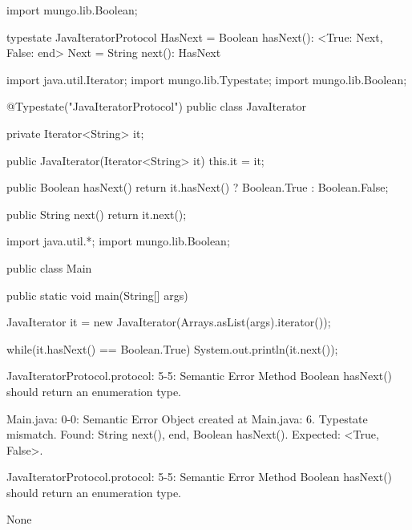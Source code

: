 \begin{code}
import mungo.lib.Boolean;

typestate JavaIteratorProtocol {
  HasNext = {
    Boolean hasNext(): <True: Next, False: end>
  }
  Next = {
    String next(): HasNext
  }
}\end{code}

\begin{code}
import java.util.Iterator;
import mungo.lib.Typestate;
import mungo.lib.Boolean;

@Typestate("JavaIteratorProtocol")
public class JavaIterator {

  private Iterator<String> it;

  public JavaIterator(Iterator<String> it) {
    this.it = it;
  }

	public Boolean hasNext() {
    return it.hasNext() ? Boolean.True : Boolean.False;
  }

  public String next() {
    return it.next();
  }

}\end{code}

\begin{code}
import java.util.*;
import mungo.lib.Boolean;

public class Main {
	public static void main(String[] args) {
		JavaIterator it = new JavaIterator(Arrays.asList(args).iterator());
    
    while(it.hasNext() == Boolean.True){
      System.out.println(it.next());
    }
	}
}\end{code}

\lstset{language=,caption=Original Mungo output}
\begin{code}

JavaIteratorProtocol.protocol: 5-5: Semantic Error
		Method Boolean hasNext() should return an enumeration type.

Main.java: 0-0: Semantic Error
		Object created at Main.java: 6. Typestate mismatch. Found: String next(), end, Boolean hasNext(). Expected: <True, False>.

JavaIteratorProtocol.protocol: 5-5: Semantic Error
		Method Boolean hasNext() should return an enumeration type.
\end{code}

\lstset{language=,caption=New Mungo output}
\begin{code}
None
\end{code}

